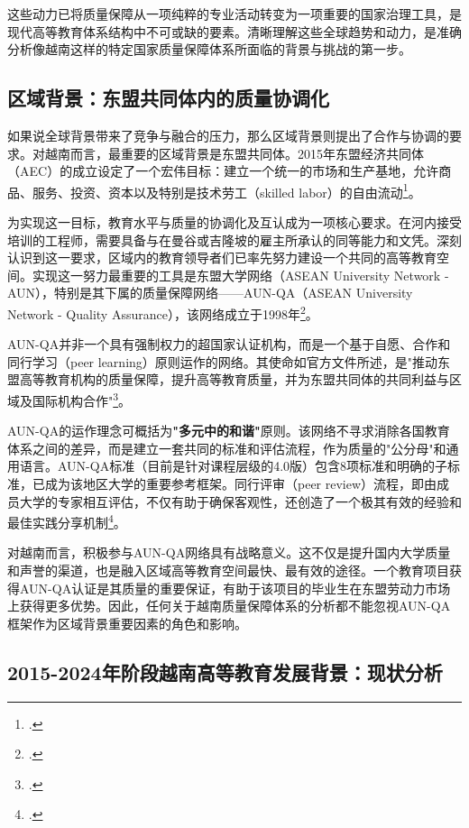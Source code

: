 这些动力已将质量保障从一项纯粹的专业活动转变为一项重要的国家治理工具，是现代高等教育体系结构中不可或缺的要素。清晰理解这些全球趋势和动力，是准确分析像越南这样的特定国家质量保障体系所面临的背景与挑战的第一步。

\subsection{区域背景：东盟共同体内的质量协调化}
\label{subsec:boi_canh_khu_vuc}

如果说全球背景带来了竞争与融合的压力，那么区域背景则提出了合作与协调的要求。对越南而言，最重要的区域背景是东盟共同体。2015年东盟经济共同体（AEC）的成立设定了一个宏伟目标：建立一个统一的市场和生产基地，允许商品、服务、投资、资本以及特别是技术劳工（skilled labor）的自由流动\footcite{ASEAN_AEC_Blueprint}。

为实现这一目标，教育水平与质量的协调化及互认成为一项核心要求。在河内接受培训的工程师，需要具备与在曼谷或吉隆坡的雇主所承认的同等能力和文凭。深刻认识到这一要求，区域内的教育领导者们已率先努力建设一个共同的高等教育空间。实现这一努力最重要的工具是东盟大学网络（ASEAN University Network - AUN），特别是其下属的质量保障网络——AUN-QA（ASEAN University Network - Quality Assurance），该网络成立于1998年\footcite{AUNQA_History}。

AUN-QA并非一个具有强制权力的超国家认证机构，而是一个基于自愿、合作和同行学习（peer learning）原则运作的网络。其使命如官方文件所述，是"推动东盟高等教育机构的质量保障，提升高等教育质量，并为东盟共同体的共同利益与区域及国际机构合作"\footcite{AUN-QAGuide}。

AUN-QA的运作理念可概括为\textbf{"多元中的和谐"}原则。该网络不寻求消除各国教育体系之间的差异，而是建立一套共同的标准和评估流程，作为质量的"公分母"和通用语言。AUN-QA标准（目前是针对课程层级的4.0版）包含8项标准和明确的子标准，已成为该地区大学的重要参考框架。同行评审（peer review）流程，即由成员大学的专家相互评估，不仅有助于确保客观性，还创造了一个极其有效的经验和最佳实践分享机制\footcite{AUNQA_Report2023}。

对越南而言，积极参与AUN-QA网络具有战略意义。这不仅是提升国内大学质量和声誉的渠道，也是融入区域高等教育空间最快、最有效的途径。一个教育项目获得AUN-QA认证是其质量的重要保证，有助于该项目的毕业生在东盟劳动力市场上获得更多优势。因此，任何关于越南质量保障体系的分析都不能忽视AUN-QA框架作为区域背景重要因素的角色和影响。


\subsection{2015-2024年阶段越南高等教育发展背景：现状分析}


